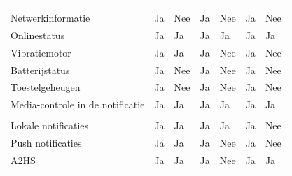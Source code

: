 \begin{table}[H]
\begin{tabular}{p{6cm}p{13mm}p{15mm}p{13mm}p{13mm}p{13mm}p{13mm}}
				 &  & &  &  &  &  \\
				 
				  Netwerkinformatie & \cellcolor{green!40} Ja  &  \cellcolor{red!50} Nee & \cellcolor{green!40} Ja  & \cellcolor{red!50} Nee & \cellcolor{green!40} Ja &  \cellcolor{red!50} Nee \\
				  
				  Onlinestatus & \cellcolor{green!40} Ja  & \cellcolor{green!40} Ja & \cellcolor{green!40} Ja  & \cellcolor{green!40} Ja & \cellcolor{green!40} Ja & \cellcolor{green!40} Ja \\
				  
				  Vibratiemotor & \cellcolor{green!40} Ja  & \cellcolor{green!40} Ja & \cellcolor{green!40} Ja & \cellcolor{red!50} Nee  & \cellcolor{green!40} Ja & \cellcolor{red!50} Nee \\
				  
				  Batterijstatus & \cellcolor{green!40} Ja  &  \cellcolor{red!50} Nee & \cellcolor{green!40} Ja  & \cellcolor{red!50} Nee & \cellcolor{green!40} Ja &  \cellcolor{red!50} Nee \\
				  
				  Toestelgeheugen & \cellcolor{green!40} Ja  &  \cellcolor{red!50} Nee & \cellcolor{green!40} Ja  & \cellcolor{red!50} Nee & \cellcolor{green!40} Ja &  \cellcolor{red!50} Nee \\
				  
				  Media-controle in de notificatie & \cellcolor{green!40} Ja  & \cellcolor{green!40} Ja & \cellcolor{green!40} Ja  & \cellcolor{green!40} Ja & \cellcolor{green!40} Ja & \cellcolor{green!40} Ja \\
				  
				   &  & &  &  &  &  \\
				   
				   Lokale notificaties & \cellcolor{green!40} Ja  & \cellcolor{green!40} Ja & \cellcolor{green!40} Ja  & \cellcolor{green!40} Ja & \cellcolor{green!40} Ja &  \cellcolor{red!50} Nee \\
				   
				   Push notificaties  & \cellcolor{green!40} Ja  & \cellcolor{green!40} Ja & \cellcolor{green!40} Ja & \cellcolor{red!50} Nee  & \cellcolor{green!40} Ja & \cellcolor{red!50} Nee \\
				   
				   A2HS & \cellcolor{green!40} Ja  & \cellcolor{green!40} Ja & \cellcolor{green!40} Ja & \cellcolor{red!50} Nee  & \cellcolor{green!40} Ja & \cellcolor{green!40} Ja \\
				   

\end{tabular}
\end{table}
